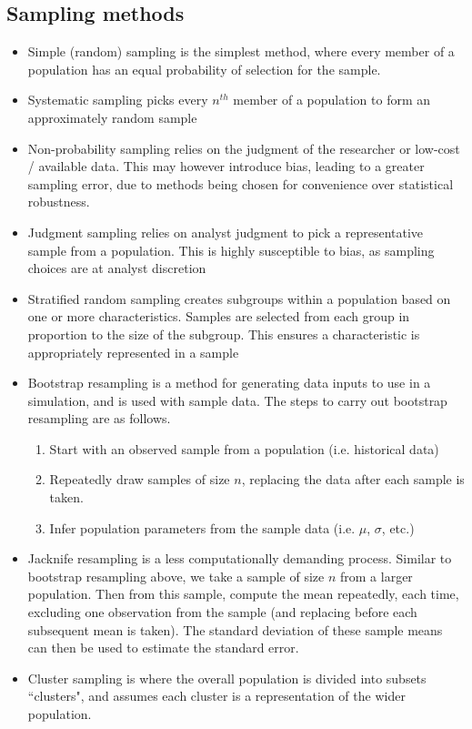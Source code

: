 \documentclass[../notes_compiled.tex]{subfiles}
\begin{document}
\subsection{Sampling methods}
\begin{itemize}
\item Simple (random) sampling is the simplest method, where every member of a population has an equal probability of selection for the sample.
\item Systematic sampling picks every $n^{th}$ member of a population to form an approximately random sample
\item Non-probability sampling relies on the judgment of the researcher or low-cost / available data. This may however introduce bias, leading to a greater sampling error, due to methods being chosen for convenience over statistical robustness.
\item Judgment sampling relies on analyst judgment to pick a representative sample from a population. This is highly susceptible to bias, as sampling choices are at analyst discretion
\item Stratified random sampling creates subgroups within a population based on one or more characteristics. Samples are selected from each group in proportion to the size of the subgroup. This ensures a characteristic is appropriately represented in a sample
\item Bootstrap resampling is a method for generating data inputs to use in a simulation, and is used with sample data. The steps to carry out bootstrap resampling are as follows.
\begin{enumerate}
\item Start with an observed sample from a population (i.e. historical data)
\item Repeatedly draw samples of size $n$, replacing the data after each sample is taken.
\item Infer population parameters from the sample data (i.e. $\mu$, $\sigma$, etc.)
\end{enumerate}
\item Jacknife resampling is a less computationally demanding process. Similar to bootstrap resampling above, we take a sample of size $n$ from a larger population. Then from this sample, compute the mean repeatedly, each time, excluding one observation from the sample (and replacing before each subsequent mean is taken). The standard deviation of these sample means can then be used to estimate the standard error.
\item Cluster sampling is where the overall population is divided into subsets ``clusters", and assumes each cluster is a representation of the wider population.

\end{itemize}
\end{document}
